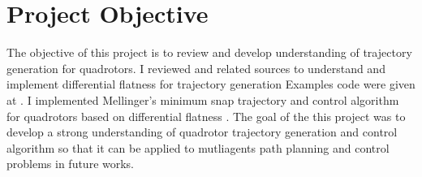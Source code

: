 \documentclass[conference,onecolumn,10pt]{IEEEtran}
\begin{document}
%



\section{Project Objective}
The objective of this project is to review and develop understanding of trajectory generation for quadrotors. I reviewed \cite{mellinger2011minimum} and related sources \cite{mellinger2012trajectory, michael2010grasp} to understand and implement differential flatness for trajectory generation Examples code were given at \cite{AerialRobotics, AerialRobotics1}. I implemented Mellinger's minimum snap trajectory and control algorithm for quadrotors based on differential flatness \cite{mellinger2011minimum, mellinger2012trajectory}. The goal of the this project was to develop a strong understanding of quadrotor trajectory generation and control algorithm so that it can be applied to mutliagents path planning and control problems in future works. 
\end{document}

